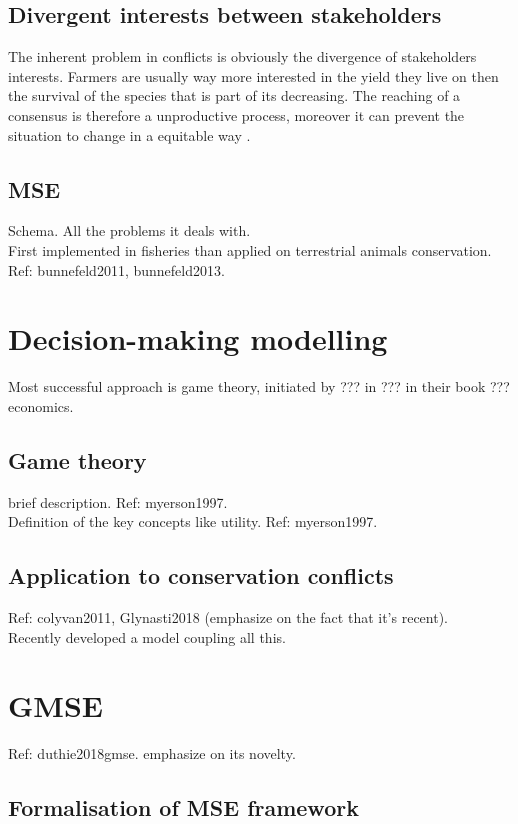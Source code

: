 \documentclass[12pt,a4paper]{article}
\begin{document}
\subsection{Divergent interests between stakeholders}
The inherent problem in conflicts is obviously the divergence of stakeholders interests.
Farmers are usually way more interested in the yield they live on then the survival of the species that is part of its decreasing.
The reaching of a consensus is therefore a unproductive process, moreover it can prevent the situation to change in a equitable way \citep{peterson2005conservation}.

\subsection{MSE}

Schema.
All the problems it deals with. \\
First implemented in fisheries than applied on terrestrial animals conservation. Ref: bunnefeld2011, bunnefeld2013.\\

\section{Decision-making modelling}

Most successful approach is game theory, initiated by ??? in ??? in their book ??? economics.

\subsection{Game theory}
brief description. Ref: myerson1997.\\
Definition of the key concepts like utility. Ref: myerson1997.

\subsection{Application to conservation conflicts}
Ref: colyvan2011, Glynasti2018 (emphasize on the fact that it's recent).\\

Recently developed a model coupling all this.
\section{GMSE} Ref: duthie2018gmse. emphasize on its novelty.

\subsection{Formalisation of MSE framework}
\end{document}
